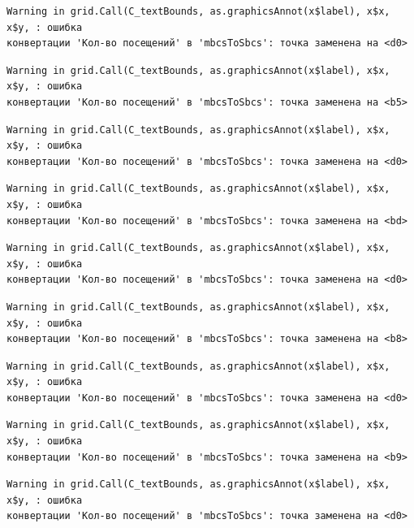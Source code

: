 \documentclass[
  letterpaper,
  DIV=11,
  numbers=noendperiod]{scrreprt}
\begin{document}
\begin{verbatim}
Warning in grid.Call(C_textBounds, as.graphicsAnnot(x$label), x$x, x$y, : ошибка
конвертации 'Кол-во посещений' в 'mbcsToSbcs': точка заменена на <d0>
\end{verbatim}

\begin{verbatim}
Warning in grid.Call(C_textBounds, as.graphicsAnnot(x$label), x$x, x$y, : ошибка
конвертации 'Кол-во посещений' в 'mbcsToSbcs': точка заменена на <b5>
\end{verbatim}

\begin{verbatim}
Warning in grid.Call(C_textBounds, as.graphicsAnnot(x$label), x$x, x$y, : ошибка
конвертации 'Кол-во посещений' в 'mbcsToSbcs': точка заменена на <d0>
\end{verbatim}

\begin{verbatim}
Warning in grid.Call(C_textBounds, as.graphicsAnnot(x$label), x$x, x$y, : ошибка
конвертации 'Кол-во посещений' в 'mbcsToSbcs': точка заменена на <bd>
\end{verbatim}

\begin{verbatim}
Warning in grid.Call(C_textBounds, as.graphicsAnnot(x$label), x$x, x$y, : ошибка
конвертации 'Кол-во посещений' в 'mbcsToSbcs': точка заменена на <d0>
\end{verbatim}

\begin{verbatim}
Warning in grid.Call(C_textBounds, as.graphicsAnnot(x$label), x$x, x$y, : ошибка
конвертации 'Кол-во посещений' в 'mbcsToSbcs': точка заменена на <b8>
\end{verbatim}

\begin{verbatim}
Warning in grid.Call(C_textBounds, as.graphicsAnnot(x$label), x$x, x$y, : ошибка
конвертации 'Кол-во посещений' в 'mbcsToSbcs': точка заменена на <d0>
\end{verbatim}

\begin{verbatim}
Warning in grid.Call(C_textBounds, as.graphicsAnnot(x$label), x$x, x$y, : ошибка
конвертации 'Кол-во посещений' в 'mbcsToSbcs': точка заменена на <b9>
\end{verbatim}

\begin{verbatim}
Warning in grid.Call(C_textBounds, as.graphicsAnnot(x$label), x$x, x$y, : ошибка
конвертации 'Кол-во посещений' в 'mbcsToSbcs': точка заменена на <d0>
\end{verbatim}
\end{document}
